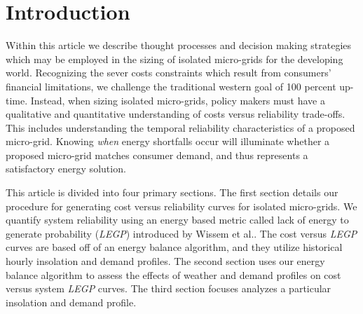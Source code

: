 \documentclass{article}
\begin{document}
\begin{abstract}

\end{abstract}

\section{Introduction}

Within this article we describe thought processes and decision making strategies which may be employed in the sizing of isolated micro-grids for the developing world. 
Recognizing the sever costs constraints which result from consumers' financial limitations, we challenge the traditional western goal of 100 percent up-time. 
Instead, when sizing isolated micro-grids, policy makers must have a qualitative and quantitative understanding of costs versus reliability trade-offs.
This includes understanding the temporal reliability characteristics of a proposed micro-grid.
Knowing \emph{when} energy shortfalls occur will illuminate whether a proposed micro-grid matches consumer demand, and thus represents a satisfactory energy solution.  

This article is divided into four primary sections.
The first section details our procedure for generating cost versus reliability curves for isolated micro-grids. We quantify system reliability using an energy based metric called lack of energy to generate probability (\emph{LEGP}) introduced by Wissem et al.\cite{}. 
The cost versus \emph{LEGP} curves are based off of an energy balance algorithm, and they utilize historical hourly insolation and demand profiles.
The second section uses our energy balance algorithm to assess the effects of weather and demand profiles on cost versus system \emph{LEGP} curves.  
The third section focuses analyzes a particular insolation and demand profile. 
\end{document}
